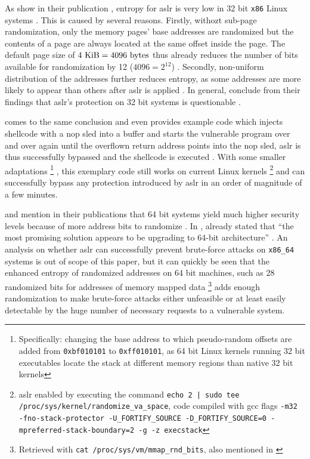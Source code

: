 As \citeauthor{MarcoGisbert2016} show in their publication , entropy for \gls{aslr} is very low in 32 bit \texttt{x86} Linux systems \cite[4\psqq]{MarcoGisbert2016}.
This is caused by several reasons.
Firstly, withozt sub-page randomization, only the memory pages' base addresses are randomized but the contents of a page are always located at the same offset inside the page.
The default page size of $ 4 \text{\space KiB} = 4096 \text{\space bytes} $ thus already reduces the number of bits available for randomization by 12 ($ 4096 = 2^{12} $) \cite[8\psqq]{MarcoGisbert2016}.
Secondly, non-uniform distribution of the addresses further reduces entropy, as some addresses are more likely to appear than others after \gls{aslr} is applied \cite[4\psqq]{MarcoGisbert2016}.
In general, \citeauthor{MarcoGisbert2016} conclude from their findings that \gls{aslr}'s protection on 32 bit systems is questionable \cite[15]{MarcoGisbert2016}.

 comes to the same conclusion and even provides example code which injects shellcode with a \acs{nop} sled into a buffer and starts the vulnerable program over and over again until the overflown return address points into the \acs{nop} sled, \gls{aslr} is thus successfully bypassed and the shellcode is executed \cite[3\psq]{Mueller2008}.
With some smaller adaptations%
	\footnote{Specifically: changing the base address to which pseudo-random offsets are added from \texttt{0xbf010101} to \texttt{0xff010101}, as 64 bit Linux kernels running 32 bit executables locate the stack at different memory regions than native 32 bit kernels}%
, this exemplary code still works on current Linux kernels%
	\footnote{\gls{aslr} enabled by executing the command \texttt{echo 2 | sudo tee /proc/sys/kernel/randomize\_\linebreak[0]va\_space}, code compiled with \gls{gcc} flags \texttt{-m32 -fno-stack-protector -U\_FORTIFY\_SOURCE -D\_FORTIFY\_SOURCE=0 -mpreferred-stack-boundary=2 -g -z execstack}}
and can successfully bypass any protection introduced by \gls{aslr} in an order of magnitude of a few minutes.

 and \citeauthor{Mueller2008} mention in their publications that 64 bit systems yield much higher security levels because of more address bits to randomize \cites[15]{MarcoGisbert2016}[3]{Mueller2008}.
In \citeyear{Shacham2004}, \citeauthor{Shacham2004} already stated that ``the most promising solution appears to be upgrading to 64-bit architecture'' \cite[306]{Shacham2004}.
An analysis on whether \gls{aslr} can successfully prevent brute-force attacks on \texttt{x86\_64} systems is out of scope of this paper, but it can quickly be seen that the enhanced entropy of randomized addresses on 64 bit machines, such as 28 randomized bits for addresses of memory mapped data%
	\footnote{Retrieved with \texttt{cat /proc/sys/vm/mmap\_rnd\_bits}, also mentioned in \cite[4\psq]{MarcoGisbert2016}}
adds enough randomization to make brute-force attacks either unfeasible or at least easily detectable by the huge number of necessary requests to a vulnerable system.

